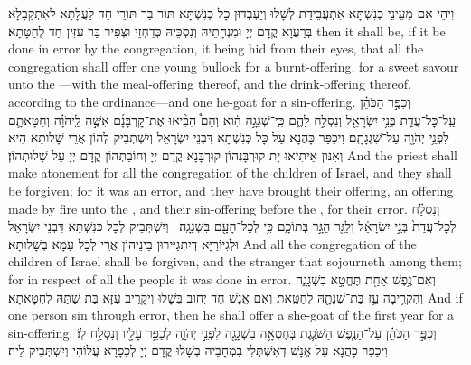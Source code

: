 {וִיהֵי אִם מֵעֵינֵי כְּנִשְׁתָּא אִתְעֲבֵידַת לְשָׁלוּ וְיַעְבְּדוּן כָּל כְּנִשְׁתָּא תּוֹר בַּר תּוֹרֵי חַד לַעֲלָתָא לְאִתְקַבָּלָא בְּרַעֲוָא קֳדָם יְיָ וּמִנְחָתֵיהּ וְנִסְכֵּיהּ כְּדַחְזֵי וּצְפִיר בַּר עִזִּין חַד לְחַטָּתָא׃}
{then it shall be, if it be done in error by the congregation, it being hid from their eyes, that all the congregation shall offer one young bullock for a burnt-offering, for a sweet savour unto the \lord—with the meal-offering thereof, and the drink-offering thereof, according to the ordinance—and one he-goat for a sin-offering.}{}
{וְכִפֶּ֣ר הַכֹּהֵ֗ן עַֽל־כׇּל־עֲדַ֛ת בְּנֵ֥י יִשְׂרָאֵ֖ל וְנִסְלַ֣ח לָהֶ֑ם כִּֽי־שְׁגָגָ֣ה הִ֔וא וְהֵם֩ הֵבִ֨יאוּ אֶת־קׇרְבָּנָ֜ם אִשֶּׁ֣ה לַֽיהֹוָ֗ה וְחַטָּאתָ֛ם לִפְנֵ֥י יְהֹוָ֖ה עַל־שִׁגְגָתָֽם׃
}
{וִיכַפַּר כָּהֲנָא עַל כָּל כְּנִשְׁתָּא דִּבְנֵי יִשְׂרָאֵל וְיִשְׁתְּבֵיק לְהוֹן אֲרֵי שָׁלוּתָא הִיא וְאִנּוּן אֵיתִיאוּ יָת קוּרְבָּנְהוֹן קוּרְבָּנָא קֳדָם יְיָ וְחוֹבַתְהוֹן קֳדָם יְיָ עַל שָׁלוּתְהוֹן׃}
{And the priest shall make atonement for all the congregation of the children of Israel, and they shall be forgiven; for it was an error, and they have brought their offering, an offering made by fire unto the \lord, and their sin-offering before the \lord, for their error.}{}
{וְנִסְלַ֗ח לְכׇל־עֲדַת֙ בְּנֵ֣י יִשְׂרָאֵ֔ל וְלַגֵּ֖ר הַגָּ֣ר בְּתוֹכָ֑ם כִּ֥י לְכׇל־הָעָ֖ם בִּשְׁגָגָֽה׃ \setuma }
{וְיִשְׁתְּבֵיק לְכָל כְּנִשְׁתָּא דִּבְנֵי יִשְׂרָאֵל וּלְגִיּוֹרַיָּא דְּיִתְגַּיְּירוּן בֵּינֵיהוֹן אֲרֵי לְכָל עַמָּא בְּשָׁלוּתָא׃}
{And all the congregation of the children of Israel shall be forgiven, and the stranger that sojourneth among them; for in respect of all the people it was done in error.}{}
{וְאִם־נֶ֥פֶשׁ אַחַ֖ת תֶּחֱטָ֣א בִשְׁגָגָ֑ה וְהִקְרִ֛יבָה עֵ֥ז בַּת־שְׁנָתָ֖הּ לְחַטָּֽאת׃
}
{וְאִם אֱנָשׁ חַד יְחוּב בְּשָׁלוּ וִיקָרֵיב עִזָּא בַּת שַׁתַּהּ לְחַטָּאתָא׃}
{And if one person sin through error, then he shall offer a she-goat of the first year for a sin-offering.}{}
{וְכִפֶּ֣ר הַכֹּהֵ֗ן עַל־הַנֶּ֧פֶשׁ הַשֹּׁגֶ֛גֶת בְּחֶטְאָ֥ה בִשְׁגָגָ֖ה לִפְנֵ֣י יְהֹוָ֑ה לְכַפֵּ֥ר עָלָ֖יו וְנִסְלַ֥ח לֽוֹ׃}
{וִיכַפַּר כָּהֲנָא עַל אֱנָשׁ דְּאִשְׁתְּלִי בִּמְחָבֵיהּ בְּשָׁלוּ קֳדָם יְיָ לְכַפָּרָא עֲלוֹהִי וְיִשְׁתְּבֵיק לֵיהּ׃}
